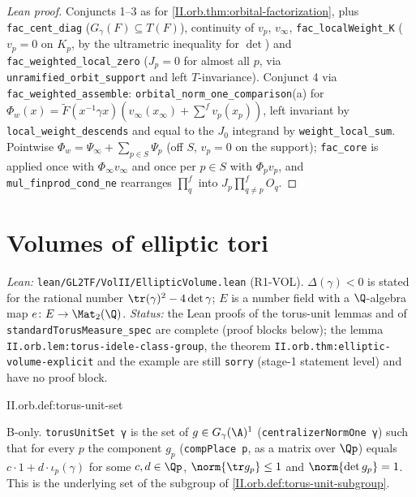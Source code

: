 \begin{proof}[Lean proof]
Conjuncts 1--3 as for \cref{II.orb.thm:orbital-factorization}, plus \texttt{fac\_cent\_diag} ($G_\gamma(F)\subseteq T(F)$), continuity of $v_p$, $v_\infty$, \texttt{fac\_localWeight\_K} ($v_p=0$ on $K_p$, by the ultrametric inequality for $\det$) and \texttt{fac\_weighted\_local\_zero} ($J_p=0$ for almost all $p$, via \texttt{unramified\_orbit\_support} and left $T$-invariance). Conjunct 4 via \texttt{fac\_weighted\_assemble}: \texttt{orbital\_norm\_one\_comparison}(a) for $\Phi_w(x)=\tilde F(x^{-1}\gamma x)(v_\infty(x_\infty)+\sum^f v_p(x_p))$, left invariant by \texttt{local\_weight\_descends} and equal to the $J_0$ integrand by \texttt{weight\_local\_sum}. Pointwise $\Phi_w=\Psi_\infty+\sum_{p\in S}\Psi_p$ (off $S$, $v_p=0$ on the support); \texttt{fac\_core} is applied once with $\Phi_\infty v_\infty$ and once per $p\in S$ with $\Phi_pv_p$, and \texttt{mul\_finprod\_cond\_ne} rearranges $\prod^f_q$ into $J_p\prod^f_{q\ne p}O_q$.
\end{proof}


\section{Volumes of elliptic tori}\label{sec:orb-volume}

\noindent\emph{Lean:} \texttt{lean/GL2TF/VolII/EllipticVolume.lean} (R1-VOL). $\Delta(\gamma)<0$ is stated for the rational number $\tr(\gamma)^2-4\det\gamma$; $E$ is a number field with a $\Q$-algebra map $e\colon E\to\Mat_2(\Q)$. \emph{Status:} the Lean proofs of the torus-unit lemmas and of \texttt{standardTorusMeasure\_spec} are complete (proof blocks below); the lemma \texttt{II.orb.lem:torus-idele-class-group}, the theorem \texttt{II.orb.thm:elliptic-volume-explicit} and the example are still \texttt{sorry} (stage-1 statement level) and have no proof block.

\begin{definition}
\bonly
{}
\end{definition}
\begin{tfformal}{II.orb.def:torus-unit-set}
\begin{tffidelity}
B-only. \texttt{torusUnitSet γ} is the set of $g\in G_\gamma(\A)^1$ (\texttt{centralizerNormOne γ}) such that for every $p$ the component $g_p$ (\texttt{compPlace p}, as a matrix over $\Qp$) equals $c\cdot1+d\cdot\iota_p(\gamma)$ for some $c,d\in\Qp$, $\norm{\tr g_p}\le1$ and $\norm{\det g_p}=1$. This is the underlying set of the subgroup of \cref{II.orb.def:torus-unit-subgroup}.
\end{tffidelity}
\end{tfformal}

